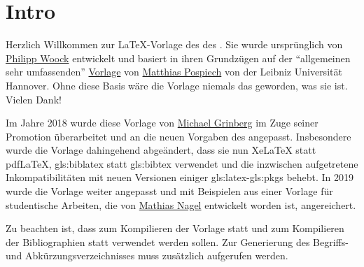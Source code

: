 \chapter*{Intro}
%
%
%
%
%
Herzlich Willkommen zur \LaTeX-Vorlage
des  %
des . %
Sie wurde ursprünglich von
\href{http://ies.anthropomatik.kit.edu/mitarbeiter.php?person=woock}{Philipp Woock}
entwickelt und basiert in ihren Grundzügen auf der \enquote{allgemeinen sehr umfassenden}
\href{http://www.matthiaspospiech.de/latex/templates/thesis/}{Vorlage} von 
\href{http://www.matthiaspospiech.de}{Matthias Pospiech} von der Leibniz Universität Hannover.
Ohne diese Basis wäre die Vorlage niemals das geworden, was sie ist. Vielen Dank!

Im Jahre 2018 wurde diese Vorlage von
\href{http://ies.anthropomatik.kit.edu/mitarbeiter.php?person=grinberg}{Michael Grinberg}
im Zuge seiner Promotion überarbeitet und an die neuen Vorgaben des  angepasst.
Insbesondere wurde die Vorlage dahingehend abgeändert, dass sie nun XeLaTeX statt pdfLaTeX, 
\gls{gls:biblatex} statt \gls{gls:bibtex} verwendet und die inzwischen aufgetretene
Inkompatibilitäten mit neuen Versionen einiger \gls{gls:latex}-\glspl{gls:pkg} behebt.
In 2019 wurde die Vorlage weiter angepasst und mit Beispielen aus einer Vorlage
für studentische Arbeiten, die von
\href{https://crypto.iti.kit.edu/index.php?id=nagel}{Mathias Nagel}
entwickelt worden ist, angereichert.

Zu beachten ist, dass zum Kompilieren der Vorlage
 statt 
und zum Kompilieren der Bibliographien
 statt 
verwendet werden sollen.
Zur Generierung des Begriffs- und Abkürzungsverzeichnisses muss zusätzlich
 aufgerufen werden.